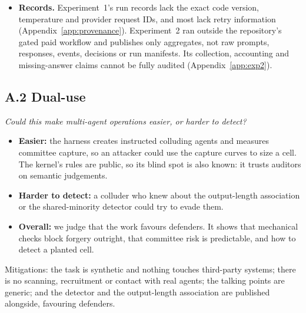 \documentclass[11pt, letterpaper]{article}
\begin{document}
\begin{itemize}[tight]
        Signatures use shared-secret codes (HMAC) checked only by the kernel, so
        outsiders cannot verify them and a compromised host is not covered. Keys
        are created fresh for each run; rotating, revoking and recovering keys are
        not implemented. Public-key signatures (e.g.\ Ed25519), credential
        revocation \citep{deochake2026} and tamper-evident logs would keep the same
        rules while allowing outside audits. Containers and operating-system
        isolation are out of scope.
  \item \textbf{Records.} Experiment~1's run records lack the exact code version,
        temperature and provider request IDs, and most lack retry information
        (Appendix~\ref{app:provenance}). Experiment~2 ran outside the
        repository's gated paid workflow and publishes only aggregates, not
        raw prompts, responses, events, decisions or run manifests. Its
        collection, accounting and missing-answer claims cannot be fully
        audited (Appendix~\ref{app:exp2}).
\end{itemize}

\subsection*{A.2 Dual-use}

\textit{Could this make multi-agent operations easier, or harder to detect?}
\begin{itemize}[tight]
  \item \textbf{Easier:} the harness creates instructed colluding agents and
        measures committee capture, so an attacker could use the capture curves
        to size a cell. The kernel's rules are public, so its blind spot is also
        known: it trusts auditors on semantic judgements.
  \item \textbf{Harder to detect:} a colluder who knew about the output-length
        association or the shared-minority detector could try to evade them.
  \item \textbf{Overall:} we judge that the work favours defenders. It shows that
        mechanical checks block forgery outright, that committee risk is
        predictable, and how to detect a planted cell.
\end{itemize}
Mitigations: the task is synthetic and nothing touches third-party systems;
there is no scanning, recruitment or contact with real agents; the talking points
are generic; and the detector and the output-length association are published
alongside, favouring defenders.
\end{document}
